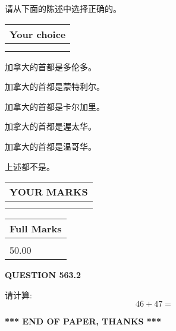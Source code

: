 \documentclass{ctexart}
\begin{document}
  
请从下面的陈述中选择正确的。
  
  
\noindent\hspace{3.0in} \begin{tabular}{|l|}
\hline
Your choice \\
\hline
 \\ 
 \\ 
\hline
\end{tabular}
  
  
 
 
加拿大的首都是多伦多。
 
 
加拿大的首都是蒙特利尔。
 
 
加拿大的首都是卡尔加里。
 
 
加拿大的首都是渥太华。
 
 
加拿大的首都是温哥华。
 
 
 上述都不是。
 
 
  
\vspace{0.2in}
  
\noindent\begin{tabular}{|l|}
\hline
 YOUR MARKS  \\
\hline
 \\ 
 \\ 
\hline
\end{tabular}
\hspace{0.05in} \begin{tabular}{|l|}
\hline
 Full Marks  \\
\hline
 \\ 
50.00 \\
\hline
\end{tabular}
{\textbf{\Large{QUESTION
563.2 
}}}
  
  
 
请计算:
\begin{equation}
46 +  %
47 = \nonumber
\end{equation}
 

 

 
   
   
 \vspace{0.2in}
 
   
   
   
   
\vspace{1.0in} 
{\textbf{\large{ *** END OF PAPER, THANKS *** }}} 
   
\end{document}

